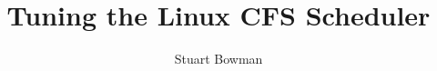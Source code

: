 \documentclass[twocolumn]{article}
\begin{document}
\title {Tuning the Linux CFS Scheduler}
\author{Stuart Bowman}
\maketitle












\end{document}
